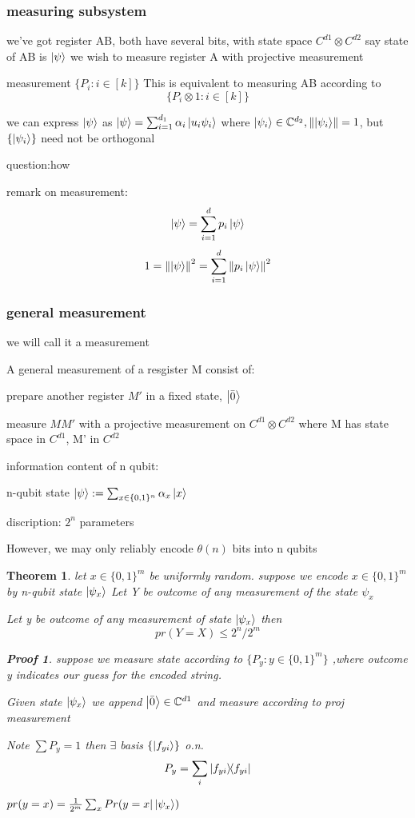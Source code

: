 \documentclass[10pt]{article}
\newcommand{\complex}{{\mathbb C}}
\newcommand{\su}[2]{\sum_{#1}^{#2}}
\theoremstyle{break}
\newtheorem{thm}{Theorem}[subsection]
\newtheorem*{pf}{Proof}
\begin{document}
\subsubsection{measuring subsystem}
we've got register AB, both have several bits, 
with state space $C^{d1}\otimes C^{d2}$
say state of AB is $\ket{\psi}$ we wish to measure register A with projective measurement

measurement $\{P_i:i\in[k]\}$ This is equivalent to measuring AB according to 
$$\{P_i\otimes 1: i\in[k]\}$$

we can express $\ket{\psi}$ as  $\ket{\psi}=\su{i=1}{d_1}\alpha_i\ket{u_i\psi_i}$
where $\ket{\psi_i}\in\complex^{d_2}, \norm{\ket{\psi_i}}=1$, but $\{\ket{\psi_i}\}$
need not be orthogonal

question:how

remark on measurement:
$$\ket{\psi}=\su{i=1}{d}p_i\ket{\psi}$$ 
$$1=\norm{\ket{\psi}}^2=\su{i=1}{d}\norm{p_i\ket{\psi}}^2$$

\subsubsection{general measurement}
we will call it a measurement

A general measurement of a resgister M consist of:

prepare another register $M'$ in a fixed state, $\ket{\bar 0}$

measure $MM'$ with a projective measurement on $C^{d1}\otimes C^{d2}$
where M has state space in $C^{d1}$, M' in $C^{d2}$

information content of n qubit:

n-qubit state $\ket{\psi}:=\su{x\in\{0,1\}^n}{}\alpha_x\ket{x}$

discription: $2^n$ parameters

However, we may only reliably encode $\theta(n)$ bits into n qubits

\begin{thm}
    let $x\in\{0,1\}^m$ be uniformly random. suppose we encode $x\in\{0,1\}^m$
    by n-qubit state $\ket{\psi_x}$ Let Y be outcome of any measurement of the state $\psi_x$

    Let y be outcome of any measurement of state $\ket{\psi_x}$ then $$pr(Y=X)\leq 2^n/2^m$$

    \begin{pf}
        suppose we measure state according to $\{P_y: y\in\{0,1\}^m\}$
        ,where outcome y indicates our guess for the encoded string.

        Given state $\ket{\psi_x}$ we append $\ket{\bar 0}\in \complex^{d1}$ and measure 
        according to proj measurement 

        Note $\sum P_y=1$ then $\exists$ basis $\{\ket{f_{yi}}\}$ o.n. 
        $$P_y=\sum_i\ketbra{f_{yi}}{f_{yi}}$$

        $pr(y=x)=\frac{1}{2^m}\sum_xPr(y=x|\ket{\psi_x})$
    \end{pf}
\end{thm}
\end{document}
